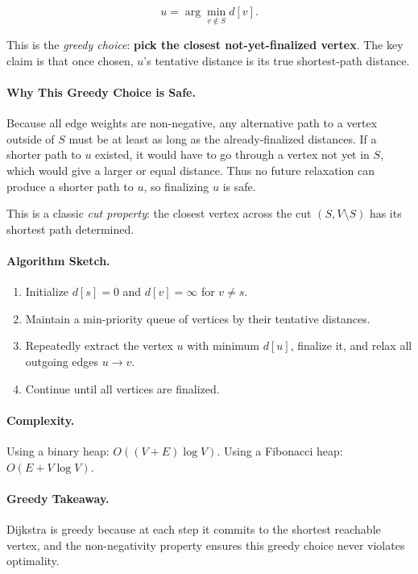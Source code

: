\documentclass[9pt]{extarticle}
\begin{document}
\[
u = \arg\min_{v \notin S} d[v].
\]

This is the \emph{greedy choice}:  
\textbf{pick the closest not-yet-finalized vertex}.  
The key claim is that once chosen, \(u\)'s tentative distance is its true shortest-path distance.

\paragraph{Why This Greedy Choice is Safe.}
Because all edge weights are non-negative, any alternative path to a vertex outside of \(S\) must be at least as long as the already-finalized distances. If a shorter path to \(u\) existed, it would have to go through a vertex not yet in \(S\), which would give a larger or equal distance. Thus no future relaxation can produce a shorter path to \(u\), so finalizing \(u\) is safe.

This is a classic \emph{cut property}:  
the closest vertex across the cut \((S, V \setminus S)\) has its shortest path determined.

\paragraph{Algorithm Sketch.}
\begin{enumerate}
    \item Initialize \(d[s] = 0\) and \(d[v] = \infty\) for \(v \ne s\).
    \item Maintain a min-priority queue of vertices by their tentative distances.
    \item Repeatedly extract the vertex \(u\) with minimum \(d[u]\), finalize it, and relax all outgoing edges \(u \to v\).
    \item Continue until all vertices are finalized.
\end{enumerate}

\paragraph{Complexity.}
Using a binary heap: \(O((V+E)\log V)\).  
Using a Fibonacci heap: \(O(E + V\log V)\).

\paragraph{Greedy Takeaway.}
Dijkstra is greedy because at each step it commits to the shortest reachable vertex, and the non-negativity property ensures this greedy choice never violates optimality.
\end{document}
